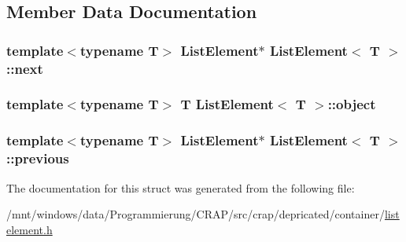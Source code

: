 \subsection{Member Data Documentation}
\hypertarget{struct_list_element_ad3adfca0f9d599149459ad4718d192ee}{
\subsubsection[{next}]{\setlength{\rightskip}{0pt plus 5cm}template$<$typename T$>$ {\bf List\-Element}$\ast$ {\bf List\-Element}$<$ T $>$\-::next}}\label{struct_list_element_ad3adfca0f9d599149459ad4718d192ee}
\hypertarget{struct_list_element_a77e8aab678263bc27d3c3dd45a4bfaf1}{
\subsubsection[{object}]{\setlength{\rightskip}{0pt plus 5cm}template$<$typename T$>$ T {\bf List\-Element}$<$ T $>$\-::object}}\label{struct_list_element_a77e8aab678263bc27d3c3dd45a4bfaf1}
\hypertarget{struct_list_element_af7ce811094ecd21223245853d202d2b8}{
\subsubsection[{previous}]{\setlength{\rightskip}{0pt plus 5cm}template$<$typename T$>$ {\bf List\-Element}$\ast$ {\bf List\-Element}$<$ T $>$\-::previous}}\label{struct_list_element_af7ce811094ecd21223245853d202d2b8}


The documentation for this struct was generated from the following file\-:\begin{DoxyCompactItemize}
\item 
/mnt/windows/data/\-Programmierung/\-C\-R\-A\-P/src/crap/depricated/container/\hyperlink{listelement_8h}{listelement.\-h}\end{DoxyCompactItemize}
